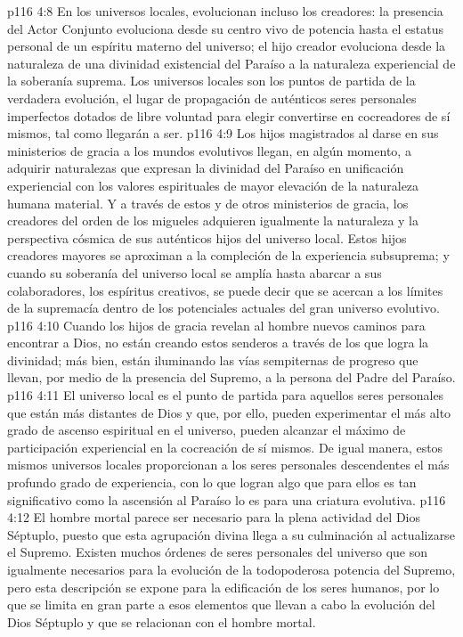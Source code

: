 \vs p116 4:8 En los universos locales, evolucionan incluso los creadores: la presencia del Actor Conjunto evoluciona desde su centro vivo de potencia hasta el estatus personal de un espíritu materno del universo; el hijo creador evoluciona desde la naturaleza de una divinidad existencial del Paraíso a la naturaleza experiencial de la soberanía suprema. Los universos locales son los puntos de partida de la verdadera evolución, el lugar de propagación de auténticos seres personales imperfectos dotados de libre voluntad para elegir convertirse en cocreadores de sí mismos, tal como llegarán a ser.
\vs p116 4:9 Los hijos magistrados al darse en sus ministerios de gracia a los mundos evolutivos llegan, en algún momento, a adquirir naturalezas que expresan la divinidad del Paraíso en unificación experiencial con los valores espirituales de mayor elevación de la naturaleza humana material. Y a través de estos y de otros ministerios de gracia, los creadores del orden de los migueles adquieren igualmente la naturaleza y la perspectiva cósmica de sus auténticos hijos del universo local. Estos hijos creadores mayores se aproximan a la compleción de la experiencia subsuprema; y cuando su soberanía del universo local se amplía hasta abarcar a sus colaboradores, los espíritus creativos, se puede decir que se acercan a los límites de la supremacía dentro de los potenciales actuales del gran universo evolutivo.
\vs p116 4:10 Cuando los hijos de gracia revelan al hombre nuevos caminos para encontrar a Dios, no están creando estos senderos a través de los que logra la divinidad; más bien, están iluminando las vías sempiternas de progreso que llevan, por medio de la presencia del Supremo, a la persona del Padre del Paraíso.
\vs p116 4:11 El universo local es el punto de partida para aquellos seres personales que están más distantes de Dios y que, por ello, pueden experimentar el más alto grado de ascenso espiritual en el universo, pueden alcanzar el máximo de participación experiencial en la cocreación de sí mismos. De igual manera, estos mismos universos locales proporcionan a los seres personales descendentes el más profundo grado de experiencia, con lo que logran algo que para ellos es tan significativo como la ascensión al Paraíso lo es para una criatura evolutiva.
\vs p116 4:12 \pc El hombre mortal parece ser necesario para la plena actividad del Dios Séptuplo, puesto que esta agrupación divina llega a su culminación al actualizarse el Supremo. Existen muchos órdenes de seres personales del universo que son igualmente necesarios para la evolución de la todopoderosa potencia del Supremo, pero esta descripción se expone para la edificación de los seres humanos, por lo que se limita en gran parte a esos elementos que llevan a cabo la evolución del Dios Séptuplo y que se relacionan con el hombre mortal.
